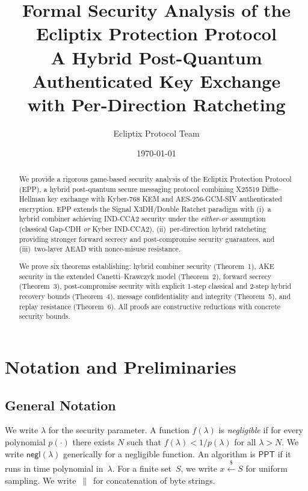 \documentclass[11pt,a4paper]{article}
\title{\textbf{Formal Security Analysis of the\\Ecliptix Protection Protocol}\\[6pt]
\large A Hybrid Post-Quantum Authenticated Key Exchange\\with Per-Direction Ratcheting}
\author{Ecliptix Protocol Team}
\date{\today}
\theoremstyle{definition}
\theoremstyle{remark}
\newcommand{\secpar}{\lambda}
\newcommand{\negl}{\mathsf{negl}}
\newcommand{\ppt}{\mathsf{PPT}}
\newcommand{\concat}{\,\|\,}
\newcommand{\getsr}{\xleftarrow{\$}}
\begin{document}
\maketitle

\begin{abstract}
We provide a rigorous game-based security analysis of the Ecliptix Protection
Protocol (EPP), a hybrid post-quantum secure messaging protocol combining
X25519 Diffie--Hellman key exchange with Kyber-768 KEM and AES-256-GCM-SIV
authenticated encryption.  EPP extends the Signal X3DH/Double Ratchet paradigm
with (i)~a hybrid combiner achieving IND-CCA2 security under the
\emph{either-or} assumption (classical Gap-CDH \emph{or} Kyber IND-CCA2),
(ii)~per-direction hybrid ratcheting providing stronger forward secrecy and
post-compromise security guarantees, and (iii)~two-layer AEAD with nonce-misuse
resistance.

We prove six theorems establishing: hybrid combiner security (Theorem~1), AKE
security in the extended Canetti--Krawczyk model (Theorem~2), forward secrecy
(Theorem~3), post-compromise security with explicit 1-step classical and
2-step hybrid recovery bounds (Theorem~4), message confidentiality and
integrity (Theorem~5), and replay resistance (Theorem~6).  All proofs are
constructive reductions with concrete security bounds.
\end{abstract}

\tableofcontents
\newpage


\section{Notation and Preliminaries}
\label{sec:prelim}

\subsection{General Notation}

We write $\secpar$ for the security parameter. A function
$f(\secpar)$ is \emph{negligible} if for every polynomial $p(\cdot)$ there
exists $N$ such that $f(\secpar) < 1/p(\secpar)$ for all $\secpar > N$.
We write $\negl(\secpar)$ generically for a negligible function.  An
algorithm is $\ppt$ if it runs in time polynomial in~$\secpar$.  For a
finite set~$S$, we write $x \getsr S$ for uniform sampling.  We write
$\concat$ for concatenation of byte strings.
\end{document}
